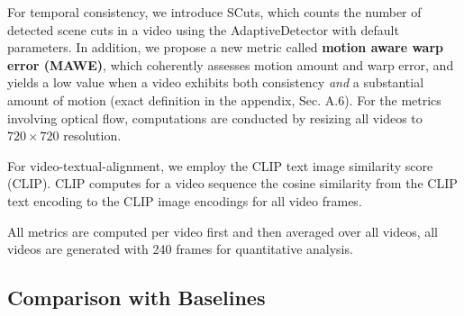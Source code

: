 For temporal consistency, we introduce SCuts, which counts the number of detected scene cuts in a video using the AdaptiveDetector \cite{PySceneDetect}  with default parameters. 
In addition, we propose a new metric called \textbf{motion aware warp error (MAWE)}, which coherently assesses motion amount and warp error, and yields a low value when a video exhibits both consistency \textit{and} a substantial amount of motion (exact definition in the appendix, Sec. \textcolor{linkblue}{A.6}).
For the metrics involving optical flow, computations are conducted by resizing all videos to $720\times720$ resolution.

For video-textual-alignment, we employ the CLIP \cite{CLIP_paper} text image similarity score (CLIP). CLIP computes for a video sequence the cosine similarity from the CLIP text encoding to the CLIP image encodings for all video frames. 


All metrics are computed per video first and then averaged over all videos, all videos are generated with 240 frames for quantitative analysis.


\subsection{Comparison with Baselines}
\label{sec:exp_comparison_with_baselines}

